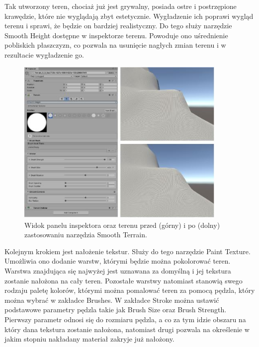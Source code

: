 Tak utworzony teren, chociaż już jest grywalny, posiada ostre i postrzępione krawędzie, które nie wyglądają zbyt estetycznie. Wygładzenie ich poprawi wygląd terenu i sprawi, że będzie on bardziej realistyczny. Do tego służy narzędzie Smooth Height dostępne w inspektorze terenu. Powoduje ono uśrednienie pobliskich płaszczyzn, co pozwala na usunięcie nagłych zmian terenu i w rezultacie wygładzenie go.

\begin{figure}[htbp]
    \centering
    \includegraphics[width=0.9\textwidth]{images/modelowanie_terenu/rzezbienie.jpg}
    \caption{Widok panelu inspektora oraz terenu przed (górny) i po (dolny) zastosowaniu narzędzia Smooth Terrain.}\label{fig:rzezbienie_terenu}
\end{figure}

Kolejnym krokiem jest nałożenie tekstur. Służy do tego narzędzie Paint Texture. Umożliwia ono dodanie warstw, którymi będzie można pokolorować teren. Warstwa znajdująca się najwyżej jest uznawana za domyślną i jej tekstura zostanie nałożona na cały teren. Pozostałe warstwy natomiast stanowią swego rodzaju paletę kolorów, którymi można pomalować teren za pomocą pędzla, który można wybrać w zakładce Brushes. W zakładce Stroke można ustawić podstawowe parametry pędzla takie jak Brush Size oraz Brush Strength. Pierwszy parametr odnosi się do rozmiaru pędzla, a co za tym idzie obszaru na który dana tekstura zostanie nałożona, natomiast drugi pozwala na określenie w jakim stopniu nakładany materiał zakryje już nałożony.

